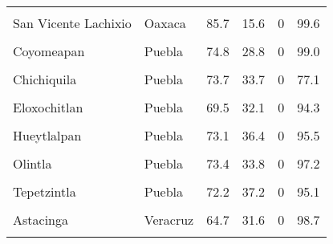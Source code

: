 \documentclass[
]{report}
\begin{document}
\begin{longtable}[t]{llrrrr}
\addlinespace
\cellcolor{gray!6}{San Vicente Coatlan} & \cellcolor{gray!6}{Oaxaca} & \cellcolor{gray!6}{85.6} & \cellcolor{gray!6}{20.4} & \cellcolor{gray!6}{0} & \cellcolor{gray!6}{95.0}\\
San Vicente Lachixio & Oaxaca & 85.7 & 15.6 & 0 & 99.6\\
\cellcolor{gray!6}{Santa Ines de Zaragoza} & \cellcolor{gray!6}{Oaxaca} & \cellcolor{gray!6}{98.0} & \cellcolor{gray!6}{20.8} & \cellcolor{gray!6}{0} & \cellcolor{gray!6}{96.0}\\
Coyomeapan & Puebla & 74.8 & 28.8 & 0 & 99.0\\
\cellcolor{gray!6}{Chiconcuautla} & \cellcolor{gray!6}{Puebla} & \cellcolor{gray!6}{64.8} & \cellcolor{gray!6}{34.4} & \cellcolor{gray!6}{0} & \cellcolor{gray!6}{84.8}\\
\addlinespace
Chichiquila & Puebla & 73.7 & 33.7 & 0 & 77.1\\
\cellcolor{gray!6}{Chilchotla} & \cellcolor{gray!6}{Puebla} & \cellcolor{gray!6}{73.5} & \cellcolor{gray!6}{31.4} & \cellcolor{gray!6}{0} & \cellcolor{gray!6}{68.2}\\
Eloxochitlan & Puebla & 69.5 & 32.1 & 0 & 94.3\\
\cellcolor{gray!6}{Hermenegildo Galeana} & \cellcolor{gray!6}{Puebla} & \cellcolor{gray!6}{74.4} & \cellcolor{gray!6}{32.7} & \cellcolor{gray!6}{0} & \cellcolor{gray!6}{96.1}\\
Hueytlalpan & Puebla & 73.1 & 36.4 & 0 & 95.5\\
\addlinespace
\cellcolor{gray!6}{Huitzilan de Serdan} & \cellcolor{gray!6}{Puebla} & \cellcolor{gray!6}{69.6} & \cellcolor{gray!6}{42.8} & \cellcolor{gray!6}{0} & \cellcolor{gray!6}{92.7}\\
Olintla & Puebla & 73.4 & 33.8 & 0 & 97.2\\
\cellcolor{gray!6}{Tepango de Rodriguez} & \cellcolor{gray!6}{Puebla} & \cellcolor{gray!6}{73.5} & \cellcolor{gray!6}{36.1} & \cellcolor{gray!6}{0} & \cellcolor{gray!6}{96.8}\\
Tepetzintla & Puebla & 72.2 & 37.2 & 0 & 95.1\\
\cellcolor{gray!6}{Santa Catarina} & \cellcolor{gray!6}{San Luis Potosi} & \cellcolor{gray!6}{81.2} & \cellcolor{gray!6}{24.7} & \cellcolor{gray!6}{0} & \cellcolor{gray!6}{71.2}\\
\addlinespace
Astacinga & Veracruz & 64.7 & 31.6 & 0 & 98.7\\
\cellcolor{gray!6}{Atlahuilco} & \cellcolor{gray!6}{Veracruz} & \cellcolor{gray!6}{65.2} & \cellcolor{gray!6}{31.6} & \cellcolor{gray!6}{0} & \cellcolor{gray!6}{98.5}\\

\end{longtable}
\end{document}
